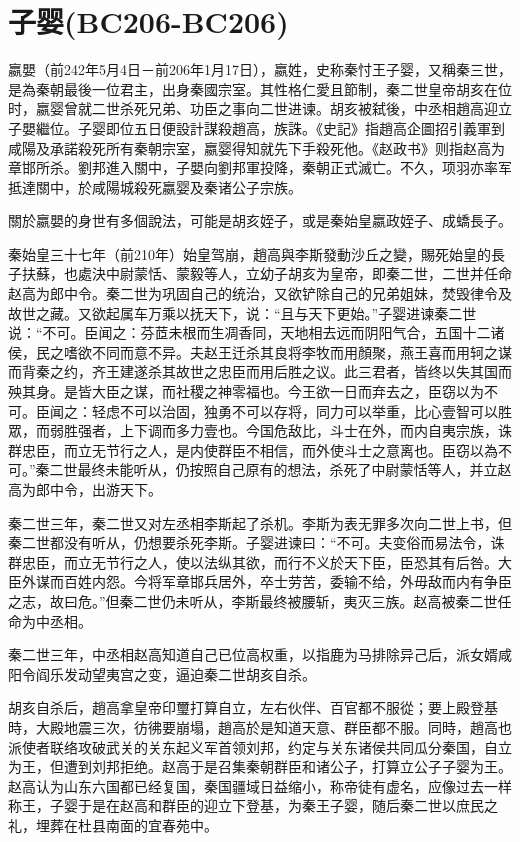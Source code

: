 
\section{子婴\tiny(BC206-BC206)}

嬴嬰（前242年5月4日－前206年1月17日），嬴姓，史称秦忖王子婴，又稱秦三世，是為秦朝最後一位君主，出身秦國宗室。其性格仁愛且節制，秦二世皇帝胡亥在位时，嬴婴曾就二世杀死兄弟、功臣之事向二世进谏。胡亥被弑後，中丞相趙高迎立子嬰繼位。子婴即位五日便設計謀殺趙高，族誅。《史記》指趙高企圖招引義軍到咸陽及承諾殺死所有秦朝宗室，嬴婴得知就先下手殺死他。《赵政书》则指赵高为章邯所杀。劉邦進入關中，子嬰向劉邦軍投降，秦朝正式滅亡。不久，项羽亦率军抵達關中，於咸陽城殺死嬴婴及秦诸公子宗族。

關於嬴嬰的身世有多個說法，可能是胡亥姪子，或是秦始皇嬴政姪子、成蟜長子。

秦始皇三十七年（前210年）始皇驾崩，趙高與李斯發動沙丘之變，賜死始皇的長子扶蘇，也處決中尉蒙恬、蒙毅等人，立幼子胡亥为皇帝，即秦二世，二世并任命赵高为郎中令。秦二世为巩固自己的统治，又欲铲除自己的兄弟姐妹，焚毁律令及故世之藏。又欲起属车万乘以抚天下，说：“且与天下更始。”子婴进谏秦二世说：“不可。臣闻之：芬茝未根而生凋香同，天地相去远而阴阳气合，五国十二诸侯，民之嗜欲不同而意不异。夫赵王迁杀其良将李牧而用顏聚，燕王喜而用轲之谋而背秦之约，齐王建遂杀其故世之忠臣而用后胜之议。此三君者，皆终以失其国而殃其身。是皆大臣之谋，而社稷之神零福也。今王欲一日而弃去之，臣窃以为不可。臣闻之：轻虑不可以治固，独勇不可以存将，同力可以举重，比心壹智可以胜眾，而弱胜强者，上下调而多力壹也。今国危敌比，斗士在外，而内自夷宗族，诛群忠臣，而立无节行之人，是内使群臣不相信，而外使斗士之意离也。臣窃以為不可。”秦二世最终未能听从，仍按照自己原有的想法，杀死了中尉蒙恬等人，并立赵高为郎中令，出游天下。

秦二世三年，秦二世又对左丞相李斯起了杀机。李斯为表无罪多次向二世上书，但秦二世都没有听从，仍想要杀死李斯。子婴进谏曰：“不可。夫变俗而易法令，诛群忠臣，而立无节行之人，使以法纵其欲，而行不义於天下臣，臣恐其有后咎。大臣外谋而百姓内怨。今将军章邯兵居外，卒士劳苦，委输不给，外毋敌而内有争臣之志，故曰危。”但秦二世仍未听从，李斯最终被腰斩，夷灭三族。赵高被秦二世任命为中丞相。

秦二世三年，中丞相赵高知道自己已位高权重，以指鹿为马排除异己后，派女婿咸阳令阎乐发动望夷宫之变，逼迫秦二世胡亥自杀。

胡亥自杀后，趙高拿皇帝印璽打算自立，左右伙伴、百官都不服從；要上殿登基時，大殿地震三次，彷彿要崩塌，趙高於是知道天意、群臣都不服。同時，趙高也派使者联络攻破武关的关东起义军首领刘邦，约定与关东诸侯共同瓜分秦国，自立为王，但遭到刘邦拒绝。赵高于是召集秦朝群臣和诸公子，打算立公子子婴为王。赵高认为山东六国都已经复国，秦国疆域日益缩小，称帝徒有虚名，应像过去一样称王，子婴于是在赵高和群臣的迎立下登基，为秦王子婴，随后秦二世以庶民之礼，埋葬在杜县南面的宜春苑中。

